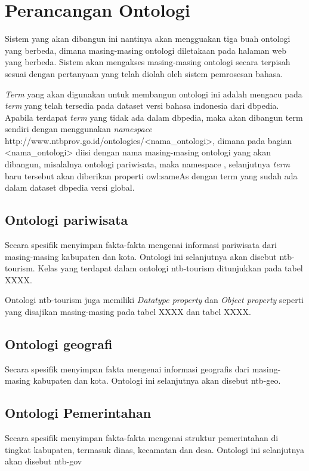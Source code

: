 \section{Perancangan Ontologi}
Sistem yang akan dibangun ini nantinya akan mengguakan tiga buah ontologi yang berbeda, dimana masing-masing ontologi diletakaan pada halaman web yang berbeda. Sistem akan mengakses masing-masing ontologi secara terpisah sesuai dengan pertanyaan yang telah diolah oleh sistem pemrosesan bahasa.

\emph{Term} yang akan digunakan untuk membangun ontologi ini adalah mengacu pada \emph{term} yang telah tersedia pada dataset versi bahasa indonesia dari dbpedia. Apabila terdapat \emph{term} yang tidak ada dalam dbpedia, maka akan dibangun term sendiri dengan menggunakan \emph{namespace} http://www.ntbprov.go.id/ontologies/<nama_ontologi>, dimana pada bagian <nama_ontologi> diisi dengan nama masing-masing ontologi yang akan dibangun, misalalnya ontologi pariwisata, maka namespace , selanjutnya \emph{term} baru tersebut akan diberikan properti owl:sameAs dengan term yang sudah ada dalam dataset dbpedia versi global.

\subsection{Ontologi pariwisata}
Secara spesifik menyimpan fakta-fakta mengenai informasi pariwisata dari masing-masing kabupaten dan kota. Ontologi ini selanjutnya akan disebut ntb-tourism. Kelas yang terdapat dalam ontologi ntb-tourism ditunjukkan pada tabel XXXX.

Ontologi ntb-tourism juga memiliki \emph{Datatype property} dan \emph{Object property} seperti yang disajikan masing-masing pada tabel XXXX dan tabel XXXX.

\subsection{Ontologi geografi}
Secara spesifik menyimpan fakta mengenai informasi geografis dari masing-masing kabupaten dan kota. Ontologi ini selanjutnya akan disebut ntb-geo.

\subsection{Ontologi Pemerintahan}
Secara spesifik menyimpan fakta-fakta mengenai struktur pemerintahan di tingkat kabupaten, termasuk dinas, kecamatan dan desa. Ontologi ini selanjutnya akan disebut ntb-gov

